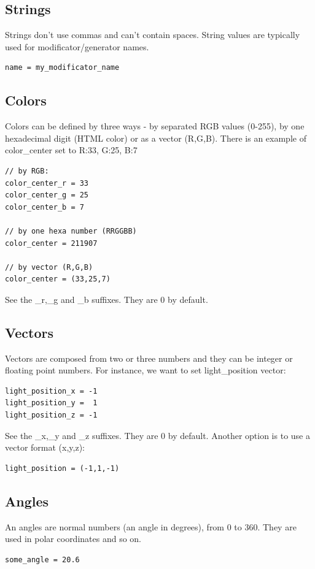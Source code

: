 \documentclass[9pt]{article}
\begin{document}
\subsection{Strings}

Strings don't use commas and can't contain spaces. String values are typically 
used for modificator/generator names.
\begin{verbatim}
name = my_modificator_name
\end{verbatim}

\subsection{Colors}
Colors can be defined by three ways - by separated RGB values (0-255),
by one hexadecimal digit (HTML color) or as a vector (R,G,B). There is an example
of color\_center set to R:33, G:25, B:7
\begin{verbatim}
// by RGB:
color_center_r = 33
color_center_g = 25
color_center_b = 7

// by one hexa number (RRGGBB)
color_center = 211907

// by vector (R,G,B)
color_center = (33,25,7) 
\end{verbatim}
See the \_r,\_g and \_b suffixes. They are 0 by default.

\subsection{Vectors}

Vectors are composed from two or three numbers and they
can be integer or floating point numbers. For instance, we want to 
set light\_position vector:
\begin{verbatim}
light_position_x = -1
light_position_y =  1
light_position_z = -1
\end{verbatim}
See the \_x,\_y and \_z suffixes. They are 0 by default. Another option is
to use a vector format (x,y,z):
\begin{verbatim}
light_position = (-1,1,-1)
\end{verbatim}

\subsection{Angles}

An angles are normal numbers (an angle in degrees), from 0 to 360. 
They are used in polar coordinates and so on.
\begin{verbatim}
some_angle = 20.6
\end{verbatim}
\end{document}
